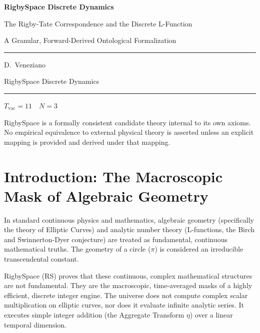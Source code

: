 \documentclass[11pt, letterpaper]{article}
\newcommand{\Tvac}{T_{\mathrm{vac}}}
\newcommand{\aop}{\eta}
\begin{document}
\begin{titlepage}
  \centering
  \vspace*{2cm}
  {\Huge\bfseries\color{RSblue} RigbySpace Discrete Dynamics\par}
  \vspace{0.5cm}
  {\LARGE The Rigby-Tate Correspondence and the Discrete L-Function\par}
  \vspace{0.5cm}
  {\large A Granular, Forward-Derived Ontological Formalization\par}
  \vspace{2cm}
  \rule{0.6\textwidth}{0.4pt}\par
  \vspace{1cm}
  {\large D.\ Veneziano\par}
  \vspace{0.8cm}
  {\normalsize RigbySpace Discrete Dynamics\par}
  \vspace{1.5cm}
  \rule{0.6\textwidth}{0.4pt}\par
  \vspace{0.5cm}
  {\small $\Tvac = 11 \quad N = 3$ \par}
  \vfill
  {\small\color{RSgray}
  RigbySpace is a formally consistent candidate theory internal to its own
  axioms. No empirical equivalence to external physical theory is asserted
  unless an explicit mapping is provided and derived under that mapping.\par}
\end{titlepage}

\tableofcontents
\newpage

\section{Introduction: The Macroscopic Mask of Algebraic Geometry}

In standard continuous physics and mathematics, algebraic geometry (specifically the theory of Elliptic Curves) and analytic number theory (L-functions, the Birch and Swinnerton-Dyer conjecture) are treated as fundamental, continuous mathematical truths. The geometry of a circle ($\pi$) is considered an irreducible transcendental constant.

RigbySpace (RS) proves that these continuous, complex mathematical structures are not fundamental. They are the macroscopic, time-averaged masks of a highly efficient, discrete integer engine. The universe does not compute complex scalar multiplication on elliptic curves, nor does it evaluate infinite analytic series. It executes simple integer addition (the Aggregate Transform $\aop$) over a linear temporal dimension.
\end{document}

